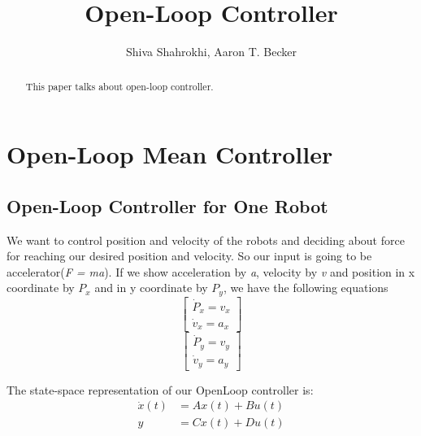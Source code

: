 \documentclass[letterpaper, 10 pt, conference]{ieeeconf}
\begin{document}
\author{Shiva Shahrokhi, Aaron T. Becker}
\title{Open-Loop Controller}
\maketitle
\thispagestyle{fancy}
\pagestyle{fancy}
\addtolength{\headsep}{0.2in}
\addtolength{\topmargin}{-0.2in}

\begin{abstract}
This paper talks about open-loop controller.

\end{abstract}

\section{Open-Loop Mean Controller}




\subsection{Open-Loop Controller for One Robot}

We want to control position and velocity of the robots and deciding about force for reaching our desired position and velocity. So our input is going to be accelerator(\emph{F = ma}). If we show acceleration by \emph{a}, velocity by \emph{v} and position in x coordinate by \emph{$P_x$} and in y coordinate by \emph{$P_y$}, we have the following equations
\begin{equation}
\begin{bmatrix}
\dot{P}_x = v_x \\
\dot{v}_x = a_x
\end{bmatrix}
\end{equation}
\begin{equation}
\begin{bmatrix}
\dot{P}_y = v_y \\
\dot{v}_y = a_y
\end{bmatrix}
\end{equation}



The state-space representation of our OpenLoop controller is: 
\begin{align}
\dot{x}(t)  &=  A x(t) + B u(t) \\
y &= C x(t) + D u(t)\nonumber
\end{align}
\end{document}
